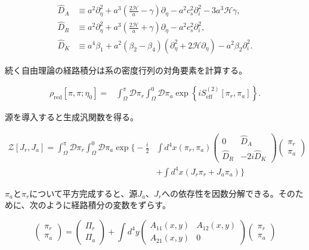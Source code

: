 \documentclass[a4paper,11pt]{ltjsarticle}
\numberwithin{equation}{section}
\def\pia{\pi_{a}}
\def\pir{\pi_{r}}
\begin{document}
\begin{align}
\widehat{D}_{A}& \equiv a^2\partial_{\eta}^{2}+ a^3 \left(\frac{2\mathcal{H}}{a}- \gamma\right)\partial_{\eta}-a^2c_{s}^{2} \partial_{i}^{2}- 3a^3 \mathcal{H} \gamma,\\
\widehat{D}_{R}&\equiv a^2\partial_{\eta}^{2}+a^3\left(\frac{2\mathcal{H}}{a}+ \gamma\right)\partial_{\eta}- a^2 c_s^2\partial_{i}^{2},\\
\widehat{D}_{K}&\equiv a^4\beta_{1}+a^2(\beta_{2}-\beta_{4})\left(\partial^{2}_{\eta}+2\mathcal{H}\partial_{\eta}\right)-a^2 \beta_{2}\partial_{i}^{2}.
\end{align}

続く自由理論の経路積分は系の密度行列の対角要素を計算する。

\begin{align}
\rho_{\mathrm{red}}\left[\pi, \pi;\eta_0\right] = &\int_{\Omega}^\pi \mathcal{D}\pir  \int_{\Omega}^{0}\mathcal{D}\pia \exp\left\{i  S_{\text{eff}}^{(2)}[\pir,\pia]\right\}.
\end{align}

源を導入すると生成汎関数を得る。

\begin{align}
\mathcal{Z}[J_{r},J_{a}]=\int_{\Omega}^\pi \mathcal{D}\pir  \int_{\Omega}^{0}\mathcal{D}\pia \exp\Big\{-\frac{i}{2}  &\int d^{4}x \left(\pir,\pia\right)\begin{pmatrix}
0 & \widehat{D}_{A} \\ \widehat{D}_{R} & -2i\widehat{D}_{K}
\end{pmatrix}\begin{pmatrix}
\pir \\ \pia
\end{pmatrix} \nonumber\\
&+\int d^{4}x \left(J_{r}\pir+J_{a}\pia\right)\Big\}
\end{align}

$\pia$と$\pir$について平方完成すると、源$J_a$、$J_r$への依存性を因数分解できる。そのために、次のように経路積分の変数をずらす。

\begin{equation}
\begin{pmatrix}
\pir \\ \pia
\end{pmatrix}=\begin{pmatrix}
\Pi_{r} \\ \Pi_{a}
\end{pmatrix}+\int d^{4}y \begin{pmatrix}
A_{11}(x,y) & A_{12}(x,y) \\  A_{21}(x,y) & 0
\end{pmatrix}\begin{pmatrix}
\pir \\ \pia
\end{pmatrix}
\end{equation}
\end{document}
